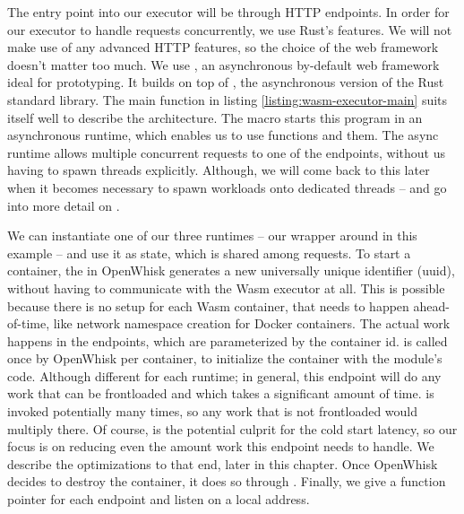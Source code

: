 The entry point into our executor will be through HTTP endpoints. In order for our executor to handle requests concurrently, we use Rust's  features. We will not make use of any advanced HTTP features, so the choice of the web framework doesn't matter too much. We use  \cite{Turon2021}, an asynchronous by-default web framework ideal for prototyping. It builds on top of , the asynchronous version of the Rust standard library. The main function in listing \ref{listing:wasm-executor-main} suits itself well to describe the architecture. The  macro starts this program in an asynchronous runtime, which enables us to use  functions and  them. The async runtime allows multiple concurrent requests to one of the endpoints, without us having to spawn threads explicitly. Although, we will come back to this later when it becomes necessary to spawn workloads onto dedicated threads -- and go into more detail on .

We can instantiate one of our three runtimes -- our wrapper around  in this example -- and use it as state, which is shared among requests. To start a container, the  in OpenWhisk generates a new universally unique identifier (uuid), without having to communicate with the Wasm executor at all. This is possible because there is no setup for each Wasm container, that needs to happen ahead-of-time, like network namespace creation for Docker containers. The actual work happens in the endpoints, which are parameterized by the container id.  is called once by OpenWhisk per container, to initialize the container with the module's code. Although different for each runtime; in general, this endpoint will do any work that can be frontloaded and which takes a significant amount of time.  is invoked potentially many times, so any work that is not frontloaded would multiply there. Of course,  is the potential culprit for the cold start latency, so our focus is on reducing even the amount work this endpoint needs to handle. We describe the optimizations to that end, later in this chapter. Once OpenWhisk decides to destroy the container, it does so through .
Finally, we give  a function pointer for each endpoint and listen on a local address.

